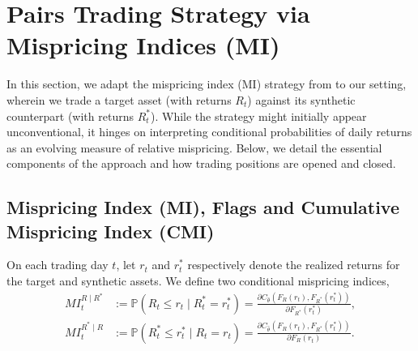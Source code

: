 \section{Pairs Trading Strategy via Mispricing Indices (MI)} \label{sec:mpi_strategy}

In this section, we adapt the mispricing index (MI) strategy from \cite{Xie2016} to our setting, wherein we trade a target asset (with returns $R_t$) against its synthetic counterpart (with returns $R_t^*$). While the strategy might initially appear unconventional, it hinges on interpreting conditional probabilities of daily returns as an evolving measure of relative mispricing. Below, we detail the essential components of the approach and how trading positions are opened and closed.

\subsection{Mispricing Index (MI), Flags and Cumulative Mispricing Index (CMI)}

On each trading day $t$, let $r_t$ and $r_t^*$ respectively denote the realized returns for the target and synthetic assets. We define two conditional mispricing indices,
\begin{align*}
MI_t^{R \mid R^*} 
&:= \mathbb{P}(R_t \leq r_t \mid R_t^* = r_t^*)
= 
\frac{\partial C_{\hat{\theta}}(F_R(r_t), F_{R^*}(r_t^*))}{\partial F_{R^*}(r_t^*)}
,
\\[0.4em]
MI_t^{R^* \mid R} 
&:= \mathbb{P}(R_t^* \leq r_t^* \mid R_t = r_t)
= 
\frac{\partial C_{\hat{\theta}}(F_R(r_t), F_{R^*}(r_t^*))}{\partial F_R(r_t)}
.
\end{align*}

